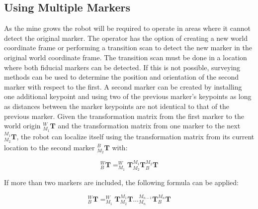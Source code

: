 \subsection{Using Multiple Markers}

As the mine grows the robot will be required to operate in areas where it cannot detect the original marker. The operator has the option of creating a new world coordinate frame or performing a transition scan to detect the new marker in the original world coordinate frame. The transition scan must be done in a location where both fiducial markers can be detected. If this is not possible, surveying methods can be used to determine the position and orientation of the second marker with respect to the first. A second marker can be created by installing one additional keypoint and using two of the previous marker's keypoints as long as distances between the marker keypoints are not identical to that of the previous marker. Given the transformation matrix from the first marker to the world origin $^{W}_{M_1}\mathbf{T}$ and the transformation matrix from one marker to the next $^{M_1}_{M_2}\mathbf{T}$, the robot can localize itself using the transformation matrix from its current location to the second marker $^{B}_{M_2}\mathbf{T}$ with:

\begin{equation}
\label{eq:mtmat}
    ^{W}_{B}\mathbf{T} = ^{W}_{M_1}\mathbf{T}^{M_1}_{M_2}\mathbf{T}^{M_2}_{B}\mathbf{T}
\end{equation}

If more than two markers are included, the following formula can be applied:

\begin{equation}
\label{eq:mmtmat}
   ^{W}_{B}\mathbf{T} = ^{W}_{M_1}\mathbf{T}^{M_1}_{M_2}\mathbf{T}\hdots^{M_{n-1}}_{M_n}\mathbf{T}^{M_n}_{B}\mathbf{T}
\end{equation}
